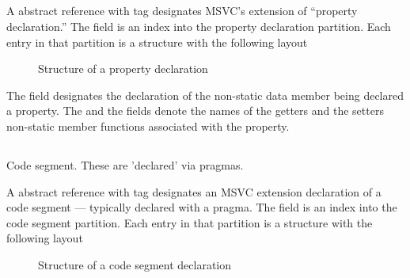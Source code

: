 


\subsection{}
\label{sec:ifc:DeclSort:Property}

A  abstract reference with tag 
designates MSVC's extension of ``property declaration.''  The 
field is an index into the property declaration partition.  Each entry in that partition
is a structure with the following layout
%
\begin{figure}[H]
	\centering
	\caption{Structure of a property declaration}
	\label{fig:ifc-property-declaration-structure}
\end{figure}
%
The  field designates the declaration of the non-static data member
being declared a property.  The  and the  fields 
denote the names of the getters and the setters non-static member functions associated
with the property.




\subsection{}
\label{sec:ifc:DeclSort:OutputSegment}

 Code segment. These are 'declared' via pragmas.

 A  abstract reference with tag 
 designates an MSVC extension declaration of a code segment --- typically declared with a pragma.
 The  field is an index into the code segment partition.  Each entry
 in that partition is a structure with the following layout
 \begin{figure}[H]
	\centering
	\caption{Structure of a code segment declaration}
	\label{fig:ifc-code-segment-structure}
 \end{figure}

